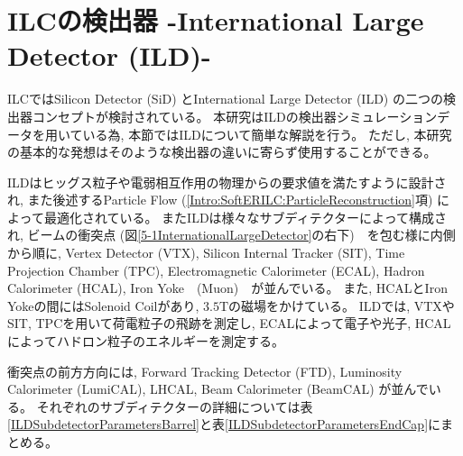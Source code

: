 \section{ILCの検出器 -International Large Detector (ILD)-} \label{Intro:InternationalLargeDetector}

ILCではSilicon Detector (SiD) とInternational Large Detector (ILD) の二つの検出器コンセプトが検討されている。
本研究はILDの検出器シミュレーションデータを用いている為, 本節ではILDについて簡単な解説を行う。
ただし, 本研究の基本的な発想はそのような検出器の違いに寄らず使用することができる。

ILDはヒッグス粒子や電弱相互作用の物理からの要求値を満たすように設計され, また後述するParticle Flow (\ref{Intro:SoftERILC:ParticleReconstruction}項) によって最適化されている。
またILDは様々なサブディテクターによって構成され, ビームの衝突点 (図\ref{5-1InternationalLargeDetector}の右下)　を包む様に内側から順に, Vertex Detector (VTX), Silicon Internal Tracker (SIT), Time Projection Chamber (TPC), Electromagnetic Calorimeter (ECAL), Hadron Calorimeter (HCAL), Iron Yoke　(Muon)　が並んでいる。
また, HCALとIron Yokeの間にはSolenoid Coilがあり, $3.5 \mathrm{T}$の磁場をかけている。
ILDでは, VTXやSIT, TPCを用いて荷電粒子の飛跡を測定し, ECALによって電子や光子, HCALによってハドロン粒子のエネルギーを測定する。

衝突点の前方方向には, Forward Tracking Detector (FTD), Luminosity Calorimeter (LumiCAL), LHCAL, Beam Calorimeter (BeamCAL) が並んでいる。
それぞれのサブディテクターの詳細については表\ref{ILDSubdetectorParametersBarrel}と表\ref{ILDSubdetectorParametersEndCap}にまとめる。


